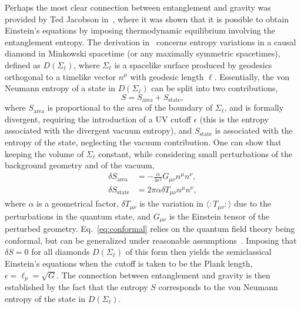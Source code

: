 \documentclass[letterpaper,12pt,titlepage,oneside,final]{book}
\newcommand{\normord}[1]{\vcentcolon\mathrel{#1}\vcentcolon}
\providecommand{\vcentcolon}{\mathrel{\mathop{:}}}
\begin{document}
Perhaps the most clear connection between entanglement and gravity was provided by Ted Jacobson in~\cite{TedOG,TedNew}, where it was shown that it is possible to obtain Einstein's equations by imposing thermodynamic equilibrium involving the entanglement entropy. The derivation in~\cite{TedNew} concerns entropy variations in a causal diamond in Minkowski spacetime (or any maximally symmetric spacetimes), defined as $D(\Sigma_\ell)$, where $\Sigma_\ell$ is a spacelike surface produced by geodesics orthogonal to a timelike vector $n^\mu$ with geodesic length $\ell$. Essentially, the von Neumann entropy of a state in $D(\Sigma_\ell)$ can be split into two contributions,
\begin{equation}
    S = S_{\text{area}} + S_\text{state},
\end{equation}
where $S_\text{area}$ is proportional to the area of the boundary of $\Sigma_\ell$, and is formally divergent, requiring the introduction of a UV cutoff $\epsilon$ (this is the entropy associated with the divergent vacuum entropy), and $S_\text{state}$ is associated with the entropy of the state, neglecting the vacuum contribution. One can show that keeping the volume of $\Sigma_\ell$ constant, while considering small perturbations of the background geometry and of the vacuum,
\begin{align}
    \delta S_\text{area} &= - \frac{\alpha}{4 \epsilon^2}G_{\mu\nu} n^\mu n^\nu, \\\delta S_\text{state} &= 2 \pi \alpha \delta T_{\mu\nu} n^\mu n^\nu,\label{eq:conformal}
\end{align}
where $\alpha$ is a geometrical factor, $\delta T_{\mu\nu}$ is the variation in $\langle \normord{T_{\mu\nu}}\rangle$ due to the perturbations in the quantum state, and $G_{\mu\nu}$ is the Einstein tensor of the perturbed geometry. Eq.~\eqref{eq:conformal} relies on the quantum field theory being conformal, but can be generalized under reasonable assumptions~\cite{TedNew}. Imposing that $\delta S = 0$ for all diamonds $D(\Sigma_\ell)$ of this form then yields the semiclassical Einstein's equations when the cutoff is taken to be the Plank length, $\epsilon = \ell_p = \sqrt{G}$. The connection between entanglement and gravity is then established by the fact that the entropy $S$ corresponds to the von Neumann entropy of the state in $D(\Sigma_\ell)$. 
\end{document}
